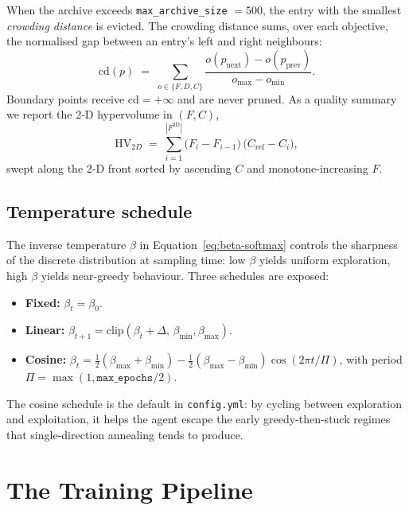 \documentclass[11pt,a4paper]{article}
\begin{document}
When the archive exceeds \texttt{max\_archive\_size} $= 500$, the entry with the smallest \emph{crowding distance} is evicted. The crowding distance sums, over each objective, the normalised gap between an entry's left and right neighbours:
\begin{equation}
\mathrm{cd}(p)
\;=\;
\sum_{o \in \{F,D,C\}}
\frac{o(p_{\text{next}}) - o(p_{\text{prev}})}{o_{\max} - o_{\min}}.
\end{equation}
Boundary points receive $\mathrm{cd} = +\infty$ and are never pruned. As a quality summary we report the 2-D hypervolume in $(F, C)$,
\begin{equation}
\mathrm{HV}_{2D}
\;=\;
\sum_{i=1}^{|F^{\text{2D}}|}
\bigl(F_i - F_{i-1}\bigr)\,\bigl(C_{\text{ref}} - C_i\bigr),
\end{equation}
swept along the 2-D front sorted by ascending $C$ and monotone-increasing $F$.

\subsection{Temperature schedule}
\label{sec:scheduler}

The inverse temperature $\beta$ in Equation~\ref{eq:beta-softmax} controls the sharpness of the discrete distribution at sampling time: low $\beta$ yields uniform exploration, high $\beta$ yields near-greedy behaviour. Three schedules are exposed:
\begin{itemize}[leftmargin=2em]
  \item \textbf{Fixed:} $\beta_t = \beta_0$.
  \item \textbf{Linear:} $\beta_{t+1} = \mathrm{clip}(\beta_t + \Delta,\, \beta_{\min}, \beta_{\max})$.
  \item \textbf{Cosine:} $\beta_t = \tfrac{1}{2}(\beta_{\max}+\beta_{\min}) - \tfrac{1}{2}(\beta_{\max}-\beta_{\min})\cos(2\pi t/\Pi)$, with period $\Pi = \max(1, \texttt{max\_epochs}/2)$.
\end{itemize}
The cosine schedule is the default in \texttt{config.yml}: by cycling between exploration and exploitation, it helps the agent escape the early greedy-then-stuck regimes that single-direction annealing tends to produce.

\section{The Training Pipeline}
\end{document}
